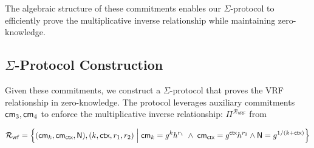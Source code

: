 The algebraic structure of these commitments enables our $\Sigma$-protocol to efficiently prove the multiplicative inverse relationship while maintaining zero-knowledge.


\subsection{$\Sigma$-Protocol Construction}
Given these commitments, we construct a $\Sigma$-protocol that proves the VRF relationship in zero-knowledge. The protocol leverages auxiliary commitments $\mathsf{cm}_3, \mathsf{cm}_4$
to enforce the multiplicative inverse relationship: $\Pi^{\mathcal{R}_{\textsf{VRF}}}$ from 

    \[
        \mathcal{R}_{\mathsf{vrf}} = \left\{ (\mathsf{cm}_k, \mathsf{cm}_{\textsf{ctx}}, \mathsf{N}), (k, \textsf{ctx}, r_1, r_2) \; \Big| \;  \mathsf{cm}_k = g^k h^{r_1} \; \land \;
                \mathsf{cm}_{\textsf{ctx}} = g^{\textsf{ctx}} h^{r_2} \land \textsf{N} = g^{1/(k + \textsf{ctx})} \right\}
    \]



